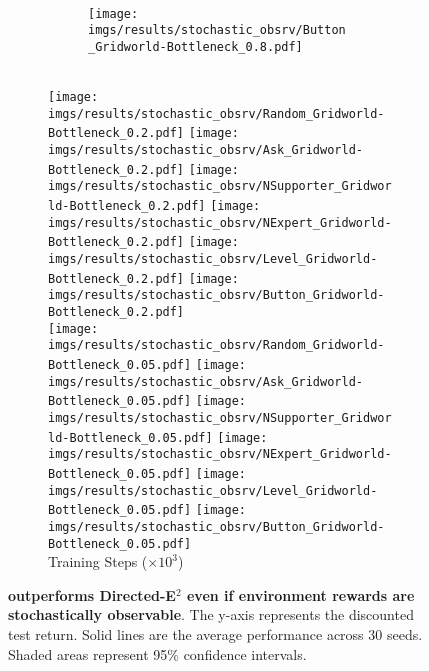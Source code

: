 \begin{figure}[!tbh]
\begin{subfigure}{\linewidth}
\begin{subfigure}[b]{0.155\textwidth}
        \\
        \texttt{[image: imgs/results/stochastic\_obsrv/Button\_Gridworld-Bottleneck\_0.8.pdf]}
    \end{subfigure} 
    \\
    \hfill
        \texttt{[image: imgs/results/stochastic\_obsrv/Random\_Gridworld-Bottleneck\_0.2.pdf]}
    \hfill
    \texttt{[image: imgs/results/stochastic\_obsrv/Ask\_Gridworld-Bottleneck\_0.2.pdf]}
    \hfill
        \texttt{[image: imgs/results/stochastic\_obsrv/NSupporter\_Gridworld-Bottleneck\_0.2.pdf]}
    \hfill
        \texttt{[image: imgs/results/stochastic\_obsrv/NExpert\_Gridworld-Bottleneck\_0.2.pdf]}
    \hfill
        \texttt{[image: imgs/results/stochastic\_obsrv/Level\_Gridworld-Bottleneck\_0.2.pdf]}
    \hfill
        \texttt{[image: imgs/results/stochastic\_obsrv/Button\_Gridworld-Bottleneck\_0.2.pdf]}
    \\
    \hfill
        \texttt{[image: imgs/results/stochastic\_obsrv/Random\_Gridworld-Bottleneck\_0.05.pdf]}
    \hfill
        \texttt{[image: imgs/results/stochastic\_obsrv/Ask\_Gridworld-Bottleneck\_0.05.pdf]}
    \hfill
        \texttt{[image: imgs/results/stochastic\_obsrv/NSupporter\_Gridworld-Bottleneck\_0.05.pdf]}
    \hfill
        \texttt{[image: imgs/results/stochastic\_obsrv/NExpert\_Gridworld-Bottleneck\_0.05.pdf]}
    \hfill
        \texttt{[image: imgs/results/stochastic\_obsrv/Level\_Gridworld-Bottleneck\_0.05.pdf]}
    \hfill
        \texttt{[image: imgs/results/stochastic\_obsrv/Button\_Gridworld-Bottleneck\_0.05.pdf]}
    \\
    \centering
    {\scriptsize{{Training Steps ($\times 10^3$)}}}
    \end{subfigure}

\caption{\textbf{\thealgo outperforms Directed-E$^2$ even if environment rewards are stochastically observable}. The y-axis represents the discounted test return. Solid lines are the average performance across 30 seeds. Shaded areas represent 95\% confidence intervals.}
\label{fig:results_stoch_observ}
\end{figure}
%
%
%